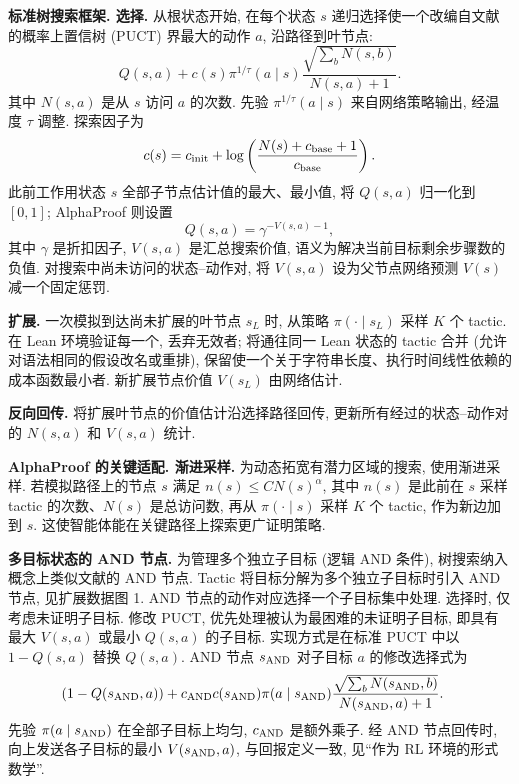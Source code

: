 \noindent\textbf{标准树搜索框架. 选择.} 从根状态开始, 在每个状态 $s$ 递归选择使一个改编自文献\cite{alphaproof-ref2}的概率上置信树 (PUCT) 界\cite{alphaproof-ref73,alphaproof-ref74}最大的动作 $a$, 沿路径到叶节点:
\label{alphaproof-equ-a}
\[
Q(s,a)+c(s)\pi^{1/\tau}(a\mid s)
\frac{\sqrt{\sum_bN(s,b)}}{N(s,a)+1}.
\]
其中 $N(s,a)$ 是从 $s$ 访问 $a$ 的次数. 先验 $\pi^{1/\tau}(a\mid s)$ 来自网络策略输出, 经温度 $\tau$ 调整. 探索因子为
\label{alphaproof-equ-b}
\[
c(s)=c_{\rm init}+\log\left(\frac{N(s)+c_{\rm base}+1}{c_{\rm base}}\right).
\]
此前工作\cite{alphaproof-ref72}用状态 $s$ 全部子节点估计值的最大、最小值, 将 $Q(s,a)$ 归一化到 $[0,1]$; AlphaProof 则设置
\label{alphaproof-equ-c}
\[
Q(s,a)=\gamma^{-V(s,a)-1},
\]
其中 $\gamma$ 是折扣因子, $V(s,a)$ 是汇总搜索价值, 语义为解决当前目标剩余步骤数的负值. 对搜索中尚未访问的状态--动作对, 将 $V(s,a)$ 设为父节点网络预测 $V(s)$ 减一个固定惩罚.

\noindent\textbf{扩展.} 一次模拟到达尚未扩展的叶节点 $s_L$ 时, 从策略 $\pi(\cdot\mid s_L)$ 采样 $K$ 个 tactic. 在 Lean 环境验证每一个, 丢弃无效者; 将通往同一 Lean 状态的 tactic 合并 (允许对语法相同的假设改名或重排), 保留使一个关于字符串长度、执行时间线性依赖的成本函数最小者. 新扩展节点价值 $V(s_L)$ 由网络估计.

\noindent\textbf{反向回传.} 将扩展叶节点的价值估计沿选择路径回传, 更新所有经过的状态--动作对的 $N(s,a)$ 和 $V(s,a)$ 统计.

\noindent\textbf{AlphaProof 的关键适配. 渐进采样.} 为动态拓宽有潜力区域的搜索, 使用渐进采样. 若模拟路径上的节点 $s$ 满足 $n(s)\le C N(s)^\alpha$, 其中 $n(s)$ 是此前在 $s$ 采样 tactic 的次数、$N(s)$ 是总访问数, 再从 $\pi(\cdot\mid s)$ 采样 $K$ 个 tactic, 作为新边加到 $s$. 这使智能体能在关键路径上探索更广证明策略.

\noindent\textbf{多目标状态的 AND 节点.} 为管理多个独立子目标 (逻辑 AND 条件), 树搜索纳入概念上类似文献\cite{alphaproof-ref17}的 AND 节点. Tactic 将目标分解为多个独立子目标时引入 AND 节点, 见扩展数据图 1. AND 节点的动作对应选择一个子目标集中处理. 选择时, 仅考虑未证明子目标. 修改 PUCT, 优先处理被认为最困难的未证明子目标, 即具有最大 $V(s,a)$ 或最小 $Q(s,a)$ 的子目标. 实现方式是在标准 PUCT 中以 $1-Q(s,a)$ 替换 $Q(s,a)$. AND 节点 $s_{\rm AND}$ 对子目标 $a$ 的修改选择式为
\label{alphaproof-equ-d}
\[
\begin{aligned}
(1-Q(s_{\rm AND},a))
&+c_{\rm AND}c(s_{\rm AND})\pi(a\mid s_{\rm AND})
\frac{\sqrt{\sum_bN(s_{\rm AND},b)}}{N(s_{\rm AND},a)+1}.
\end{aligned}
\]
先验 $\pi(a\mid s_{\rm AND})$ 在全部子目标上均匀, $c_{\rm AND}$ 是额外乘子. 经 AND 节点回传时, 向上发送各子目标的最小 $V(s_{\rm AND},a)$, 与回报定义一致, 见“作为 RL 环境的形式数学”.


